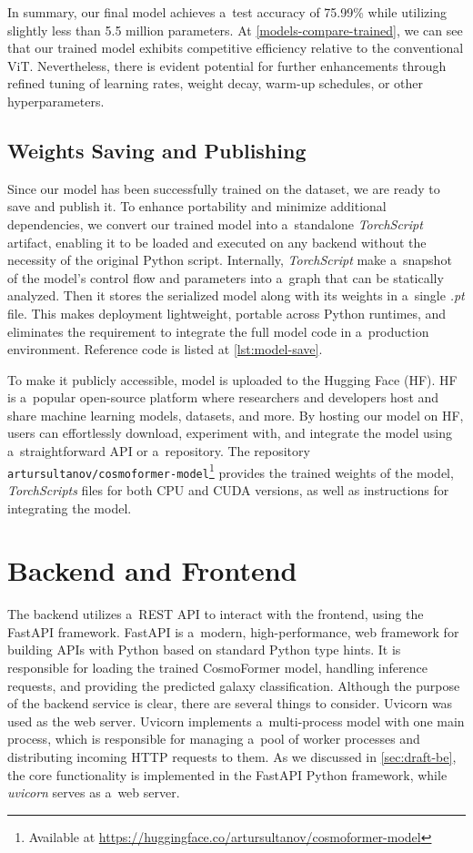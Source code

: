 In summary, our final model achieves a~test accuracy of 75.99\% while utilizing slightly less than 5.5 million parameters. At \autoref{models-compare-trained}, we can see that our trained model exhibits competitive efficiency relative to the conventional ViT. Nevertheless, there is evident potential for further enhancements through refined tuning of learning rates, weight decay, warm-up schedules, or other hyperparameters.

\subsection*{Weights Saving and Publishing}

Since our model has been successfully trained on the dataset, we are ready to save and publish it. To enhance portability and minimize additional dependencies, we convert our trained model into a~standalone \textit{TorchScript} artifact, enabling it to be loaded and executed on any backend without the necessity of the original Python script. Internally, \textit{TorchScript} make a~snapshot of the model's control flow and parameters into a~graph that can be statically analyzed. Then it stores the serialized model along with its weights in a~single \textit{.pt} file. This makes deployment lightweight, portable across Python runtimes, and eliminates the requirement to integrate the full model code in a~production environment. Reference code is listed at \autoref{lst:model-save}.

To make it publicly accessible, model is uploaded to the Hugging Face (HF). HF is a~popular open-source platform where researchers and developers host and share machine learning models, datasets, and more. By hosting our model on HF, users can effortlessly download, experiment with, and integrate the model using a~straightforward API or a~repository. The repository \texttt{artursultanov/cosmoformer-model}\footnote{Available at \url{https://huggingface.co/artursultanov/cosmoformer-model}} provides the trained weights of the model, \textit{TorchScripts} files for both CPU and CUDA versions, as well as instructions for integrating the model.

\section{Backend and Frontend}
\label{sec:back-n-front}

The backend utilizes a~REST API to interact with the frontend, using the FastAPI framework. FastAPI is a~modern, high-performance, web framework for building APIs with Python based on standard Python type hints. It is responsible for loading the trained CosmoFormer model, handling inference requests, and providing the predicted galaxy classification. Although the purpose of the backend service is clear, there are several things to consider. Uvicorn was used as the web server. Uvicorn implements a~multi-process model with one main process, which is responsible for managing a~pool of worker processes and distributing incoming HTTP requests to them. As we discussed in \autoref{sec:draft-be}, the core functionality is implemented in the FastAPI Python framework, while \textit{uvicorn} serves as a~web server. 

